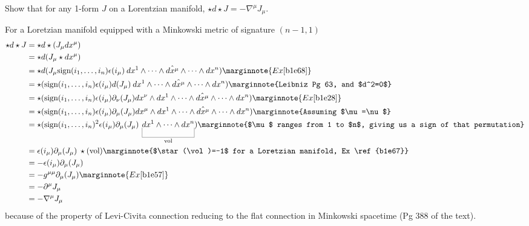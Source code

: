 \documentclass[10pt]{article}
\begin{document}
\begin{example}
	Show that for any 1-form $J$ on a Lorentzian manifold, $\star d\star J = -\nabla^\mu J_\mu$.
\end{example}
\sol For a Loretzian manifold equipped with a Minkowski metric of signature $(n-1,1)$
$$
\begin{aligned}
	\star d\star J &= \star d\star (J_\mu dx^\mu)\\
	&= \star d (J_\mu \star dx^\mu)\\
	&= \star d (J_\mu \sign(i_1,\dots,i_n) \epsilon(i_\mu)\: dx^1\wedge\cdots \wedge\hat{dx^\mu} \wedge\cdots \wedge dx^n)\marginnote{Ex \ref{b1e68}}\\
	&= \star (\sign(i_1,\dots,i_n) \epsilon(i_\mu) d(J_\mu)\: dx^1\wedge\cdots \wedge\hat{dx^\mu} \wedge\cdots \wedge dx^n)\marginnote{Leibniz Pg 63, and $d^2=0$}\\
	&= \star (\sign(i_1,\dots,i_n) \epsilon(i_\mu) \partial_\nu(J_\mu)dx^\nu\wedge dx^1\wedge\cdots \wedge\hat{dx^\mu} \wedge\cdots \wedge dx^n)\marginnote{Ex \ref{b1e28}}\\
	&= \star (\sign(i_1,\dots,i_n) \epsilon(i_\mu) \partial_\mu(J_\mu)dx^\mu\wedge dx^1\wedge\cdots \wedge\hat{dx^\mu} \wedge\cdots \wedge dx^n)\marginnote{Assuming $\mu=\nu$}\\
	&= \star (\sign(i_1,\dots,i_n)^2 \epsilon(i_\mu) \partial_\mu(J_\mu)\: \ub{dx^1\wedge\cdots\wedge dx^n}{\vol})\marginnote{$\mu$ ranges from 1 to $n$, giving us a sign of that permutation}\\
	&= \epsilon(i_\mu) \partial_\mu(J_\mu)\:\star(\vol)\marginnote{$\star(\vol)=-1$ for a Loretzian manifold, Ex \ref{b1e67}}\\
	&= -\epsilon(i_\mu) \partial_\mu(J_\mu)\\
	&= -g^{\mu\mu} \partial_\mu(J_\mu)\marginnote{Ex \ref{b1e57}}\\
	&= -\partial^\mu J_\mu\\
	&= -\nabla^\mu J_\mu
\end{aligned}
$$
because of the property of Levi-Civita connection reducing to the flat connection in Minkowski spacetime (Pg 388 of the text).
\end{document}
